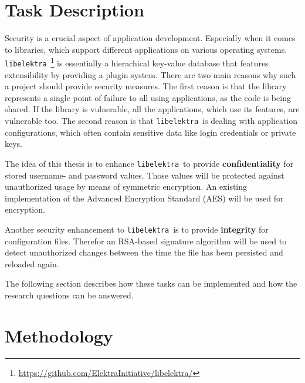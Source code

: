 \documentclass[a4paper]{article}
\newcommand{\libelektra}{\texttt{libelektra}~}
\begin{document}
\section{Task Description}
Security is a crucial aspect of application development.
Especially when it comes to libraries, which support different applications on various operating systems.
\libelektra\footnote{\url{https://github.com/ElektraInitiative/libelektra/}} is essentially a hierachical key-value database that features extensibility by providing a plugin system.
There are two main reasons why such a project should provide security measures.
The first reason is that the library represents a single point of failure to all using applications, as the code is being shared.
If the library is vulnerable, all the applications, which use its features, are vulnerable too.
The second reason is that \libelektra is dealing with application configurations, which often contain sensitive data like login credentials or private keys.

The idea of this thesis is to enhance \libelektra to provide \textbf{confidentiality} for stored username- and password values.
Those values will be protected against unauthorized usage by means of symmetric encryption.
An existing implementation of the Advanced Encryption Standard (AES) will be used for encryption.

Another security enhancement to \libelektra is to provide \textbf{integrity} for configuration files.
Therefor an RSA-based signature algorithm will be used to detect unauthorized changes between the time the file has been persisted and reloaded again.

The following section describes how these tasks can be implemented and how the research questions can be answered.


\section{Methodology}
\end{document}
